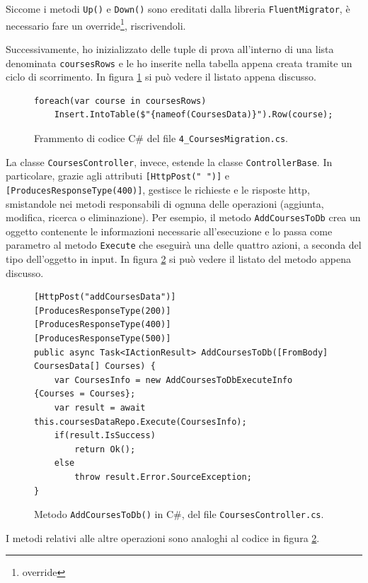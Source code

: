 Siccome i metodi \texttt{Up()} e \texttt{Down()} sono ereditati dalla libreria \texttt{FluentMigrator}, è necessario fare un override\footnote{\glsdesc{override}}, riscrivendoli.

Successivamente, ho inizializzato delle tuple di prova all'interno di una lista denominata \texttt{coursesRows} e le ho inserite nella tabella appena creata tramite un ciclo di scorrimento. In figura \ref{fig:insert} si può vedere il listato appena discusso.
\begin{figure}[H]
\begin{lstlisting}
foreach(var course in coursesRows)
    Insert.IntoTable($"{nameof(CoursesData)}").Row(course);
\end{lstlisting}
\caption{\label{fig:insert}Frammento di codice C\# del file \texttt{4\_CoursesMigration.cs}.}
\end{figure}

La classe \texttt{CoursesController}, invece, estende la classe \texttt{ControllerBase}. In particolare, grazie agli attributi \texttt{[HttpPost(" ")]} e \texttt{[ProducesResponseType(400)]}, gestisce le richieste e le risposte \acrshort{http}, smistandole nei metodi responsabili di ognuna delle operazioni (aggiunta, modifica, ricerca o eliminazione). Per esempio, il metodo \texttt{AddCoursesToDb} crea un oggetto contenente le informazioni necessarie all'esecuzione e lo passa come parametro al metodo \texttt{Execute} che eseguirà una delle quattro azioni, a seconda del tipo dell'oggetto in input. In figura \ref{fig:add} si può vedere il listato del metodo appena discusso.
\begin{figure}[H]
\begin{lstlisting}
[HttpPost("addCoursesData")]
[ProducesResponseType(200)]
[ProducesResponseType(400)]
[ProducesResponseType(500)]
public async Task<IActionResult> AddCoursesToDb([FromBody] CoursesData[] Courses) {
    var CoursesInfo = new AddCoursesToDbExecuteInfo {Courses = Courses};
    var result = await this.coursesDataRepo.Execute(CoursesInfo);
    if(result.IsSuccess)
        return Ok();
    else 
        throw result.Error.SourceException;
}
\end{lstlisting}
\caption{\label{fig:add}Metodo \texttt{AddCoursesToDb()} in C\#, del file \texttt{CoursesController.cs}.}
\end{figure}
I metodi relativi alle altre operazioni sono analoghi al codice in figura \ref{fig:add}.


